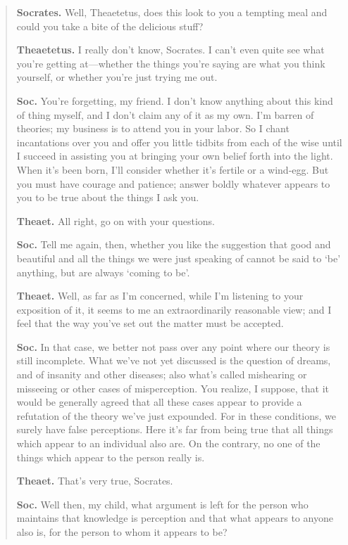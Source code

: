 \begin{quote}
\textbf{Socrates.} Well, Theaetetus, does this look to you a tempting meal and could you take a bite of the delicious stuff?

\textbf{Theaetetus.} I really don't know, Socrates. I can't even quite see what you're getting at---whether the things you're saying are what you think yourself, or whether you're just trying me out.

\textbf{Soc.} You're forgetting, my friend. I don't know anything about this kind of thing myself, and I don't claim any of it as my own. I'm barren of theories; my business is to attend you in your labor. So I chant incantations over you and offer you little tidbits from each of the wise until I succeed in assisting you at bringing your own belief forth into the light. When it's been born, I'll consider whether it's fertile or a wind-egg. But you must have courage and patience; answer boldly whatever appears to you to be true about the things I ask you.

\textbf{Theaet.} All right, go on with your questions.

\textbf{Soc.} Tell me again, then, whether you like the suggestion that good and beautiful and all the things we were just speaking of cannot be said to `be' anything, but are always `coming to be'.

\textbf{Theaet.} Well, as far as I'm concerned, while I'm listening to your exposition of it, it seems to me an extraordinarily reasonable view; and I feel that the way you've set out the matter must be accepted.

\textbf{Soc.} In that case, we better not pass over any point where our theory is still incomplete. What we've not yet discussed is the question of dreams, and of insanity and other diseases; also what's called mishearing or misseeing or other cases of misperception. You realize, I suppose, that it would be generally agreed that all these cases appear to provide a refutation of the theory we've just expounded. For in these conditions, we surely have false perceptions. Here it's far from being true that all things which appear to an individual also are. On the contrary, no one of the things which appear to the person really is.

\textbf{Theaet.} That's very true, Socrates.

\textbf{Soc.} Well then, my child, what argument is left for the person who maintains that knowledge is perception and that what appears to anyone also is, for the person to whom it appears to be?


\end{quote}
